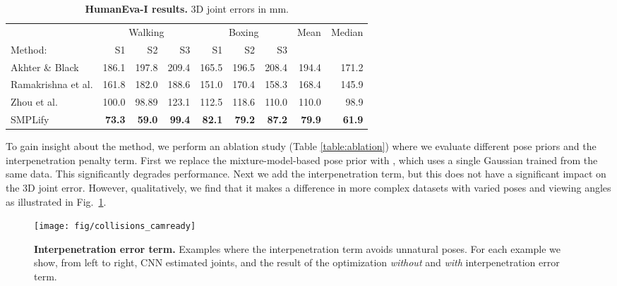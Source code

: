 \documentclass[runningheads]{llncs}
\begin{document}
\begin{table}[b]
\centering
\begin{tabular}{lrrrrrrrr}
\hline
 & \multicolumn{3}{c}{Walking} & \multicolumn{3}{c}{Boxing} & Mean & Median \\
Method: & S1 & S2 & S3 & S1 & S2 & S3 &  \\
\hline
Akhter \& Black \cite{Akhter:2015} & 186.1 & 197.8 & 209.4 & 165.5 & 196.5 &
                                                                             208.4 & 194.4 & 171.2\\
Ramakrishna et al. \cite{Ramakrishna:2012} & 161.8 & 182.0 & 188.6 & 151.0 &
                                                                             170.4 & 158.3 & 168.4 & 145.9\\
Zhou et al. \cite{Zhou:2015b} & 100.0 & 98.89 & 123.1 & 112.5 & 118.6 & 110.0 &
                                                                                110.0
                       & 98.9 \\
SMPLify & \textbf{73.3} & \textbf{59.0} & \textbf{99.4} & \textbf{82.1} &
                                                                         \textbf{79.2} & \textbf{87.2} & \textbf{79.9}& \textbf{61.9} \\\hline
\end{tabular}
\caption{{\bf HumanEva-I results.} 3D joint errors in mm. }
\label{table:heva}

\end{table}

To gain insight about the method, we perform
an ablation study  (Table \ref{table:ablation}) where we evaluate
different pose priors and the interpenetration penalty term.
First we replace the mixture-model-based pose prior with , which uses a single Gaussian trained from the same data. 
This significantly degrades performance.
Next we add the interpenetration term, but this does not have a significant
impact on the 3D joint error. However, qualitatively, we find that it makes a difference in
more complex datasets with varied poses and viewing angles as illustrated in
Fig.~\ref{fig:selfpenetration}.
\begin{figure}[t]
\centerline{
\texttt{[image: fig/collisions\_camready]}
}
\caption{{\bf Interpenetration error term.} Examples where the interpenetration
  term avoids unnatural poses. For each example we show, from left to right, CNN estimated joints, and the result of the optimization \emph{without} and \emph{with} interpenetration error term. }
\label{fig:selfpenetration}
\end{figure}
\end{document}
